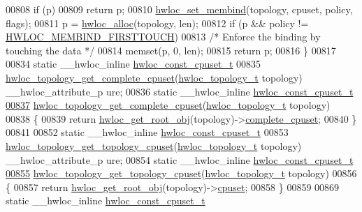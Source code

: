 \begin{DoxyCode}
00808   \textcolor{keywordflow}{if} (p)
00809     \textcolor{keywordflow}{return} p;
00810   \hyperlink{a00050_ga8b6d1d90227aff8e44ef26bc1f8a8f95}{hwloc_set_membind}(topology, cpuset, policy, flags);
00811   p = \hyperlink{a00050_gac5586e58cf25c3596b7d4aa31ce13259}{hwloc_alloc}(topology, len);
00812   \textcolor{keywordflow}{if} (p && policy != \hyperlink{a00050_ggac9764f79505775d06407b40f5e4661e8a979c7aa78dd32780858f30f47a72cca0}{HWLOC_MEMBIND_FIRSTTOUCH})
00813     \textcolor{comment}{/* Enforce the binding by touching the data */}
00814     memset(p, 0, len);
00815   \textcolor{keywordflow}{return} p;
00816 \}
00817 
00834 \textcolor{keyword}{static} \_\_hwloc\_inline \hyperlink{a00040_ga1f784433e9b606261f62d1134f6a3b25}{hwloc_const_cpuset_t}
00835 \hyperlink{a00060_ga418ebb39eaf1eac8f9cf4047cf59a534}{hwloc_topology_get_complete_cpuset}(\hyperlink{a00039_ga9d1e76ee15a7dee158b786c30b6a6e38}{hwloc_topology_t} topology) \_\_hwloc\_attribute\_p
      ure;
00836 \textcolor{keyword}{static} \_\_hwloc\_inline \hyperlink{a00040_ga1f784433e9b606261f62d1134f6a3b25}{hwloc_const_cpuset_t}
\hypertarget{a00031_source_l00837}{}\hyperlink{a00060_ga418ebb39eaf1eac8f9cf4047cf59a534}{00837} \hyperlink{a00060_ga418ebb39eaf1eac8f9cf4047cf59a534}{hwloc_topology_get_complete_cpuset}(\hyperlink{a00039_ga9d1e76ee15a7dee158b786c30b6a6e38}{hwloc_topology_t} topology)
00838 \{
00839   \textcolor{keywordflow}{return} \hyperlink{a00053_gadbf58f6e187efbdb3cd9a8e30311b7d7}{hwloc_get_root_obj}(topology)->\hyperlink{a00016_a91788a9da687beb7224cc1fd7b75208c}{complete_cpuset};
00840 \}
00841 
00852 \textcolor{keyword}{static} \_\_hwloc\_inline \hyperlink{a00040_ga1f784433e9b606261f62d1134f6a3b25}{hwloc_const_cpuset_t}
00853 \hyperlink{a00060_gaa319133e702fea664750c45735ac8a25}{hwloc_topology_get_topology_cpuset}(\hyperlink{a00039_ga9d1e76ee15a7dee158b786c30b6a6e38}{hwloc_topology_t} topology) \_\_hwloc\_attribute\_p
      ure;
00854 \textcolor{keyword}{static} \_\_hwloc\_inline \hyperlink{a00040_ga1f784433e9b606261f62d1134f6a3b25}{hwloc_const_cpuset_t}
\hypertarget{a00031_source_l00855}{}\hyperlink{a00060_gaa319133e702fea664750c45735ac8a25}{00855} \hyperlink{a00060_gaa319133e702fea664750c45735ac8a25}{hwloc_topology_get_topology_cpuset}(\hyperlink{a00039_ga9d1e76ee15a7dee158b786c30b6a6e38}{hwloc_topology_t} topology)
00856 \{
00857   \textcolor{keywordflow}{return} \hyperlink{a00053_gadbf58f6e187efbdb3cd9a8e30311b7d7}{hwloc_get_root_obj}(topology)->\hyperlink{a00016_a67925e0f2c47f50408fbdb9bddd0790f}{cpuset};
00858 \}
00859 
00869 \textcolor{keyword}{static} \_\_hwloc\_inline \hyperlink{a00040_ga1f784433e9b606261f62d1134f6a3b25}{hwloc_const_cpuset_t}

\end{DoxyCode}
